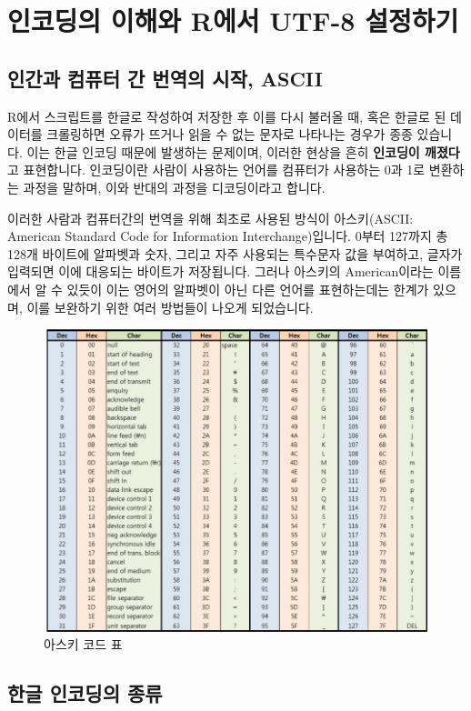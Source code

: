 \documentclass[12pt,]{book}
\begin{document}
\hypertarget{r-utf-8-}{%
\section{인코딩의 이해와 R에서 UTF-8 설정하기}\label{r-utf-8-}}

\hypertarget{ascii}{%
\subsection{인간과 컴퓨터 간 번역의 시작, ASCII}\label{ascii}}

R에서 스크립트를 한글로 작성하여 저장한 후 이를 다시 불러올 때, 혹은 한글로 된 데이터를 크롤링하면 오류가 뜨거나 읽을 수 없는 문자로 나타나는 경우가 종종 있습니다. 이는 한글 인코딩 때문에 발생하는 문제이며, 이러한 현상을 흔히 \textbf{인코딩이 깨졌다}고 표현합니다. 인코딩이란 사람이 사용하는 언어를 컴퓨터가 사용하는 0과 1로 변환하는 과정을 말하며, 이와 반대의 과정을 디코딩이라고 합니다.

이러한 사람과 컴퓨터간의 번역을 위해 최초로 사용된 방식이 아스키(ASCII: American Standard Code for Information Interchange)입니다. 0부터 127까지 총 128개 바이트에 알파벳과 숫자, 그리고 자주 사용되는 특수문자 값을 부여하고, 글자가 입력되면 이에 대응되는 바이트가 저장됩니다. 그러나 아스키의 American이라는 이름에서 알 수 있듯이 이는 영어의 알파벳이 아닌 다른 언어를 표현하는데는 한계가 있으며, 이를 보완하기 위한 여러 방법들이 나오게 되었습니다.

\begin{figure}[h]

{\centering \includegraphics[width=0.7\linewidth]{images/ascii_code} 

}

\caption{아스키 코드 표}\label{fig:unnamed-chunk-2}
\end{figure}

\hypertarget{section-5}{%
\subsection{한글 인코딩의 종류}\label{section-5}}
\end{document}
